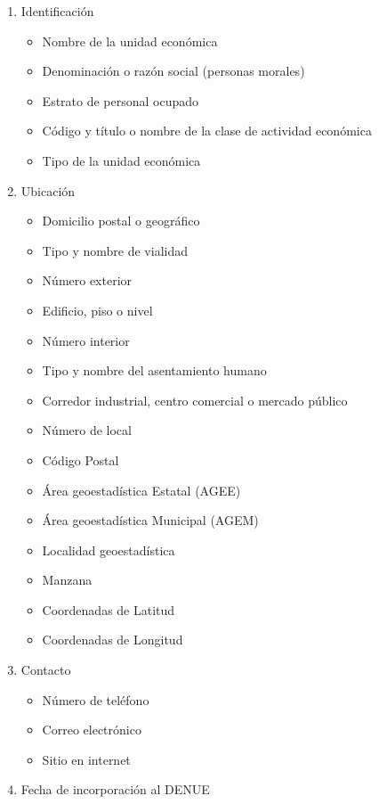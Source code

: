 \documentclass{article}
\begin{document}
\begin{enumerate}
    \item Identificación
    \begin{itemize}
        \item Nombre de la unidad económica
        \item Denominación o razón social (personas morales)
        \item Estrato de personal ocupado
        \item Código y título o nombre de la clase de actividad económica
        \item Tipo de la unidad económica
    \end{itemize}

    \item Ubicación
    \begin{itemize}
        \item Domicilio postal o geográfico
        \item Tipo y nombre de vialidad
        \item Número exterior
        \item Edificio, piso o nivel
        \item Número interior
        \item Tipo y nombre del asentamiento humano
        \item Corredor industrial, centro comercial o mercado público
        \item Número de local
        \item Código Postal
        \item Área geoestadística Estatal (AGEE)
        \item Área geoestadística Municipal (AGEM)
        \item Localidad geoestadística
        \item Manzana
        \item Coordenadas de Latitud
        \item Coordenadas de Longitud
    \end{itemize}

    \item Contacto
    \begin{itemize}
        \item Número de teléfono
        \item Correo electrónico
        \item Sitio en internet
    \end{itemize}
    \item Fecha de incorporación al DENUE
\end{enumerate}
\end{document}
